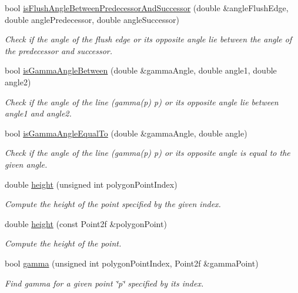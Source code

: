 \begin{DoxyCompactItemize}
bool \hyperlink{classmultiscale_1_1MinEnclosingTriangleFinder_a067f421f84dfd1803c241efc85dbc0bb}{is\-Flush\-Angle\-Between\-Predecessor\-And\-Successor} (double \&angle\-Flush\-Edge, double angle\-Predecessor, double angle\-Successor)
\begin{DoxyCompactList}\small\item\em \-Check if the angle of the flush edge or its opposite angle lie between the angle of the predecessor and successor. \end{DoxyCompactList}\item 
bool \hyperlink{classmultiscale_1_1MinEnclosingTriangleFinder_a98d91069c4e7fae9f68f0af8be5e5487}{is\-Gamma\-Angle\-Between} (double \&gamma\-Angle, double angle1, double angle2)
\begin{DoxyCompactList}\small\item\em \-Check if the angle of the line (gamma(p) p) or its opposite angle lie between angle1 and angle2. \end{DoxyCompactList}\item 
bool \hyperlink{classmultiscale_1_1MinEnclosingTriangleFinder_a3690d470807b2d5d893988370099f283}{is\-Gamma\-Angle\-Equal\-To} (double \&gamma\-Angle, double angle)
\begin{DoxyCompactList}\small\item\em \-Check if the angle of the line (gamma(p) p) or its opposite angle is equal to the given angle. \end{DoxyCompactList}\item 
double \hyperlink{classmultiscale_1_1MinEnclosingTriangleFinder_a4fd0fdc0ccc472a2d15c8d001f65d0f9}{height} (unsigned int polygon\-Point\-Index)
\begin{DoxyCompactList}\small\item\em \-Compute the height of the point specified by the given index. \end{DoxyCompactList}\item 
double \hyperlink{classmultiscale_1_1MinEnclosingTriangleFinder_a9507a3196dd16613bf828d04f196b9db}{height} (const \-Point2f \&polygon\-Point)
\begin{DoxyCompactList}\small\item\em \-Compute the height of the point. \end{DoxyCompactList}\item 
bool \hyperlink{classmultiscale_1_1MinEnclosingTriangleFinder_a800413be1e1567d986a92fac4a6b937e}{gamma} (unsigned int polygon\-Point\-Index, \-Point2f \&gamma\-Point)
\begin{DoxyCompactList}\small\item\em \-Find gamma for a given point \char`\"{}p\char`\"{} specified by its index. \end{DoxyCompactList}\item 

\end{DoxyCompactItemize}
